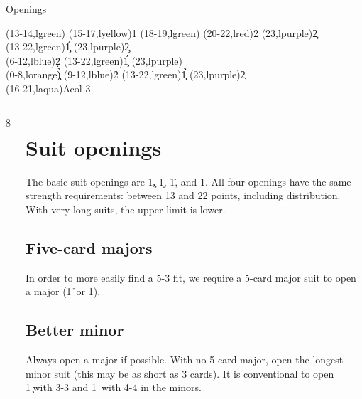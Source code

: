 
\begin{sheet}{Openings}

{\strut\hfill
\begin{ptable}
  \bid(13-14,lgreen){}
  \bid(15-17,lyellow){1\nt}
  \bid(18-19,lgreen){}
  \bid(20-22,lred){2\nt}
  \bid*(23,lpurple){2\c}\\
  \bid*(13-22,lgreen){1\c\d\h\s}
  \bid*(23,lpurple){2\c}\\
  \bid(6-12,lblue){2\d\h\s}
  \bid(13-22,lgreen){1\c\d\h\s}
  \bid(23,lpurple){}\\
  \bid(0-8,lorange){\c\d\h\s}
  \bid*(9-12,lblue){2\d\h\s}
  \bid*(13-22,lgreen){1\c\d\h\s}
  \bid*(23,lpurple){2\c}\\
  \bid(16-21,laqua){Acol 3\nt{}}\\
\end{ptable}\hfill\strut}


\begin{columns}8
\begin{column}[span=3]%
\section{Suit openings}
The basic suit openings are 1\c, 1\d, 1\h, and 1\s.  All four openings have
the same strength requirements: between 13 and 22 points, including
distribution.  With very long suits, the upper limit is lower.
\subsection{Five-card majors}
In order to more easily find a 5-3 fit, we require a 5-card major suit
to open a major (1\h\ or 1\s).
\subsection{Better minor}
Always open a major if possible.  With no 5-card major, open the longest
minor suit (this may be as short as 3 cards).  It is conventional to open
1\c\ with 3-3 and 1\d\ with 4-4 in the minors.
\end{column}


\end{columns}
\end{sheet}

